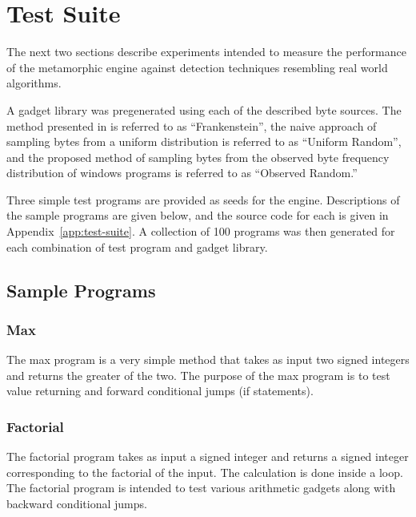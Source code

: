 \section{Test Suite}

    The next two sections describe experiments intended to measure the
    performance of the metamorphic engine against detection techniques
    resembling real world algorithms.

    A gadget library was pregenerated using each of the described byte
    sources.  The method presented in \cite{franken} is referred to as
    ``Frankenstein'', the naive approach of sampling bytes from a uniform
    distribution is referred to as ``Uniform Random'', and the proposed
    method of sampling bytes from the observed byte frequency distribution
    of windows programs is referred to as ``Observed Random.''

    Three simple test programs are provided as seeds for the engine.
    Descriptions of the sample programs are given below, and the source code
    for each is given in Appendix~\ref{app:test-suite}. A
    collection of 100 programs was then generated for each combination of
    test program and gadget library.
    
    \subsection{Sample Programs}

        \subsubsection{Max}

            The max program is a very simple method that takes as input two
            signed integers and returns the greater of the two. The purpose
            of the max program is to test value returning and forward
            conditional jumps (if statements).

        \subsubsection{Factorial}

            The factorial program takes as input a signed integer and
            returns a signed integer corresponding to the factorial of the
            input. The calculation is done inside a loop. The factorial
            program is intended to test various arithmetic gadgets along
            with backward conditional jumps.

